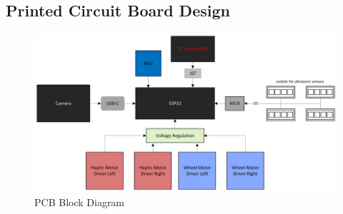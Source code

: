 \subsection{Printed Circuit Board Design} \label{sec:pcb-design}
\begin{figure}[H]
	\centering
	\includegraphics[width=\textwidth]{./Images/PCB-Block-Diagram.png}
	\caption{\label{fig:pcb}PCB Block Diagram}
\end{figure}